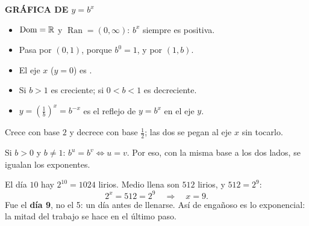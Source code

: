 \documentclass[11pt,a4paper]{article}
\newcommand{\Dom}{\operatorname{Dom}}
\newcommand{\Ran}{\operatorname{Ran}}
\begin{document}
\begin{minipage}[c]{0.5\linewidth}
{\sffamily\bfseries\small\color{zaccent}GRÁFICA DE $y=b^{x}$}
\begin{itemize}
\item $\Dom=\R$ y $\Ran=(0,\infty)$: $b^x$ siempre es positiva.
\item Pasa por $(0,1)$, porque $b^{0}=1$, y por $(1,b)$.
\item El eje $x$ ($y=0$) es .
\item Si $b>1$ es creciente; si $0<b<1$ es decreciente.
\item $y=\left(\tfrac1b\right)^{x}=b^{-x}$ es el reflejo de $y=b^x$ en el eje $y$.
\end{itemize}
\end{minipage}\hfill
\begin{minipage}[c]{0.46\linewidth}\centering
{}

{\small\color{zmute}Crece con base $2$ y decrece con base $\tfrac12$; las dos se pegan al eje $x$ sin tocarlo.}
\end{minipage}

\begin{propiedad}
Si $b>0$ y $b\neq1$: \quad $b^{u}=b^{v}\iff u=v$. Por eso, con la misma base a los dos lados, se igualan los exponentes.
\end{propiedad}

\begin{ejemplo}
El día $10$ hay $2^{10}=1024$ lirios. Medio llena son $512$ lirios, y $512=2^{9}$:
\[ 2^{x}=512=2^{9}\quad\Longrightarrow\quad x=9 . \]
Fue el \textbf{día 9}, no el 5: un día antes de llenarse. Así de engañoso es lo exponencial: la mitad del trabajo
se hace en el último paso.
\end{ejemplo}
\end{document}
